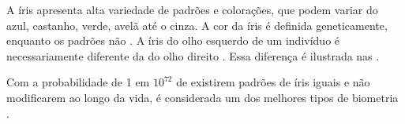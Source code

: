 %

\par A íris apresenta alta variedade de padrões e colorações, que podem variar do azul, castanho, verde, avelã até o cinza. A cor da íris é definida geneticamente, enquanto os padrões não \cite{adlerIris2003}. A íris do olho esquerdo de um indivíduo é necessariamente diferente da do olho direito \cite{wayman2005biometric}. Essa diferença é ilustrada nas .

\par Com a probabilidade de 1 em $10^{72}$ de existirem padrões de íris iguais e não modificarem ao longo da vida, é considerada um dos melhores tipos de biometria \cite{iris_UFRJ}.




